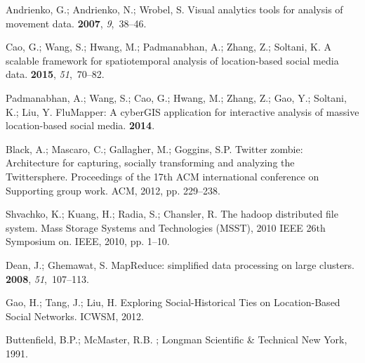 \documentclass[ijgi,article,accept,moreauthors,pdftex,10pt,a4paper]{mdpi}
\theoremstyle{mdpi}
\newcounter{ex}
\newcounter{re}
\theoremstyle{mdpidefinition}
\begin{document}
\begin{thebibliography}{-------}
Andrienko, G.; Andrienko, N.; Wrobel, S.
\newblock Visual analytics tools for analysis of movement data.
 {\bf 2007}, {\em 9},~38--46.

Cao, G.; Wang, S.; Hwang, M.; Padmanabhan, A.; Zhang, Z.; Soltani, K.
\newblock A scalable framework for spatiotemporal analysis of location-based
  social media data.
 {\bf 2015}, {\em
  51},~70--82.

Padmanabhan, A.; Wang, S.; Cao, G.; Hwang, M.; Zhang, Z.; Gao, Y.; Soltani, K.;
  Liu, Y.
\newblock FluMapper: A cyberGIS application for interactive analysis of massive
  location-based social media.
 {\bf
  2014}.

Black, A.; Mascaro, C.; Gallagher, M.; Goggins, S.P.
\newblock Twitter zombie: Architecture for capturing, socially transforming and
  analyzing the Twittersphere.
\newblock  Proceedings of the 17th ACM international conference on Supporting
  group work. ACM,  2012, pp. 229--238.

Shvachko, K.; Kuang, H.; Radia, S.; Chansler, R.
\newblock The hadoop distributed file system.
\newblock  Mass Storage Systems and Technologies (MSST), 2010 IEEE 26th
  Symposium on. IEEE,  2010, pp. 1--10.

Dean, J.; Ghemawat, S.
\newblock MapReduce: simplified data processing on large clusters.
 {\bf 2008}, {\em 51},~107--113.

Gao, H.; Tang, J.; Liu, H.
\newblock Exploring Social-Historical Ties on Location-Based Social Networks.
\newblock  ICWSM,  2012.

Buttenfield, B.P.; McMaster, R.B.
;
  Longman Scientific \& Technical New York,  1991.


\end{thebibliography}
\end{document}
